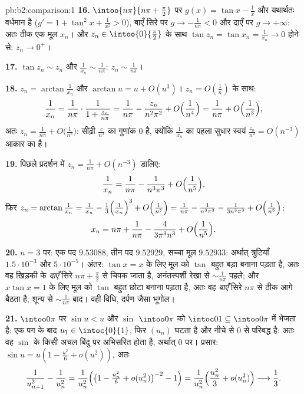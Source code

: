 \begin{solution}{pb:b2:comparison:1}
\textbf{16.} $\intoo{n\pi}{n\pi + \frac\pi2}$ पर $g(x) = \tan
x - \frac1x$  और यथार्थतः वर्धमान है ($g' = 1 +
\tan^2x + \frac1{x^2} > 0$), बाएँ सिरे
पर $g \to -\frac1{n\pi} < 0$ और दाएँ पर $g \to +\infty$: अतः ठीक एक मूल $x_n$। और $z_n \in \intoo{0}{\frac\pi2}$ के साथ $\tan z_n = \tan x_n = \frac1{x_n} \to 0$ होने से:
$z_n \to 0^+$।

\textbf{17.} $\tan z_n \sim z_n$ और $\frac1{x_n} \sim
\frac1{n\pi}$: $z_n \sim \frac1{n\pi}$।

\textbf{18.} $z_n = \arctan\frac1{x_n}$ और $\arctan u = u +
O(u^3)$। $z_n = O(\frac1n)$ के साथ:
\[
\frac1{x_n} = \frac{1}{n\pi}\cdot\frac1{1 + \frac{z_n}{n\pi}}
= \frac1{n\pi} - \frac{z_n}{n^2\pi^2} +
O\Bigl(\frac1{n^4}\Bigr)
= \frac1{n\pi} + O\Bigl(\frac1{n^3}\Bigr),
\]
अतः $z_n = \frac1{n\pi} + O\bigl(\frac1{n^3}\bigr)$: सीढ़ी $\frac{c}{n^2}$ का गुणांक $0$ है, क्योंकि $\frac1{x_n}$ का पहला सुधार स्वयं
$\frac{z_n}{n^2} = O(n^{-3})$ आकार का है।

\textbf{19.} पिछले प्रदर्शन में $z_n = \frac1{n\pi} + O(n^{-3})$ डालिए:
\[
\frac{1}{x_n} = \frac{1}{n\pi} - \frac{1}{n^3\pi^3} +
O\Bigl(\frac1{n^5}\Bigr),
\]
फिर $z_n = \arctan\frac1{x_n} = \frac1{x_n} -
\frac{1}{3}\Bigl(\frac1{x_n}\Bigr)^3 + O\Bigl(\frac1{n^5}\Bigr)
= \frac1{n\pi} - \frac{1}{n^3\pi^3} - \frac{1}{3n^3\pi^3} +
O\Bigl(\frac1{n^5}\Bigr)$:
\[
x_n = n\pi + \frac{1}{n\pi} - \frac{4}{3\pi^3n^3} +
O\Bigl(\frac1{n^5}\Bigr).
\]

\textbf{20.} $n = 3$ पर: एक पद $9.53088$, तीन पद $9.52929$, सच्चा मूल $9.52933$: अर्थात्
त्रुटियाँ $1.5\cdot10^{-3}$ और $5\cdot10^{-5}$। अंतर: $\tan x = x$ के लिए मूल को $\tan$ बहुत बड़ा बनाना पड़ता
है, अतः वह खिड़की के \emph{दाएँ} सिरे $n\pi +
\frac\pi2$ से चिपक जाता है, अनंतस्पर्शी
रेखा से $\sim\frac1{n\pi}$ पहले; और $x\tan x = 1$ के लिए मूल को $\tan$ बहुत छोटा बनाना पड़ता है,
अतः वह \emph{बाएँ} सिरे $n\pi$ से ठीक आगे बैठता है, शून्य से $\sim\frac1{n\pi}$ बाद।
वही विधि, दर्पण जैसा भूगोल।

\textbf{21.} $\intoo0\pi$ पर $\sin u < u$ और $\sin$ $\intoo0\pi$ को $\intoc01 \subseteq \intoo0\pi$ में भेजता है: एक पग के बाद
$u_1 \in \intoc{0}{1}$, फिर $(u_n)$ घटता है और नीचे से $0$ से परिबद्ध है: अतः वह $\sin$ के किसी
अचल बिंदु पर अभिसरित होता है, अर्थात् $0$ पर। प्रसार: $\sin u = u(1 - \frac{u^2}6 +
o(u^2))$, अतः
\[
\frac{1}{u_{n+1}^2} - \frac1{u_n^2}
= \frac{1}{u_n^2}\Bigl(\bigl(1 - \tfrac{u_n^2}6 +
o(u_n^2)\bigr)^{-2} - 1\Bigr)
= \frac{1}{u_n^2}\Bigl(\frac{u_n^2}{3} + o(u_n^2)\Bigr)
\longrightarrow \frac13 .
\]


\end{solution}
